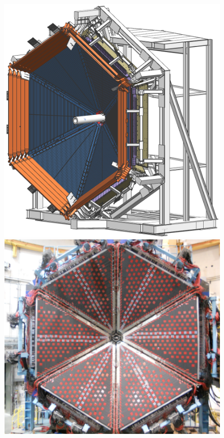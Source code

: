 \documentclass[final,3p,twocolumn]{elsarticle}
\begin{document}

\begin{figure}[htbp!]
\hspace{0.3cm}\includegraphics[width=0.95\columnwidth]{fwd_carriage-1.png}
\hspace{0.3cm}\includegraphics[width=1.0\columnwidth]{FTOF-1b.png}

\end{figure}
\end{document}
